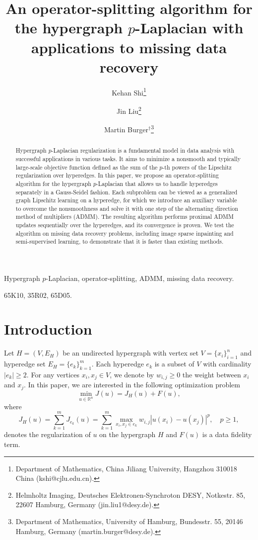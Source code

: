 \documentclass{article}
\title{An operator-splitting algorithm for the hypergraph $p$-Laplacian with applications to missing data recovery}
\author{
Kehan Shi\thanks{Department of Mathematics, China Jiliang University, Hangzhou 310018 China (kshi@cjlu.edu.cn).}
\and
Jin Liu\thanks{Helmholtz Imaging, Deutsches Elektronen-Synchroton DESY, Notkestr. 85,
22607 Hamburg, Germany (jin.liu1@desy.de).}
\and
 Martin Burger$^\dagger$\thanks{Department of Mathematics, University of Hamburg, Bundesstr. 55, 20146
Hamburg, Germany (martin.burger@desy.de).}
}
\date{}
\theoremstyle{definition}
\begin{document}

\maketitle

\begin{abstract}
Hypergraph $p$-Laplacian regularization is a fundamental model in data analysis with successful applications in various tasks. It aims to minimize a nonsmooth and typically large-scale objective function defined as the sum of the $p$-th powers of the Lipschitz regularization over hyperedges.
In this paper, we propose an operator-splitting algorithm for the hypergraph $p$-Laplacian that allows us to handle hyperedges separately in a Gauss-Seidel fashion. Each subproblem can be viewed as a generalized graph Lipschitz learning on a hyperedge, for which we introduce an auxiliary variable to overcome the nonsmoothness and solve it with one step of the alternating direction method of multipliers (ADMM).
The resulting algorithm performs proximal ADMM updates sequentially over the hyperedges, and its convergence is proven.
We test the algorithm on missing data recovery problems, including image sparse inpainting and semi-supervised learning, to demonstrate that it is faster than existing methods.
\end{abstract}

\medskip

 Hypergraph $p$-Laplacian, operator-splitting, ADMM,
missing data recovery.


\medskip

 65K10, 35R02, 65D05.



\section{Introduction}
Let $H=(V, E_H)$ be an undirected hypergraph with vertex set $V=\{x_i\}_{i=1}^n$ and hyperedge set $E_H=\{e_k\}_{k=1}^m$.
Each hyperedge $e_k$ is a subset of $V$ with cardinality $|e_k|\geq 2$.
For any vertices $x_i, x_j\in V$, we denote by $w_{i,j}\geq 0$ the weight between $x_i$ and $x_j$.
In this paper, we are interested in the following optimization problem
\begin{equation}\label{eq:1.1}
  \min_{u\in\mathbb{R}^n}
   J(u)=J_H(u)+ F(u),
\end{equation}
where
\begin{equation}\label{eq:1.1a}
J_H(u)=\sum_{k=1}^mJ_{e_k}(u)=\sum_{k=1}^m \max_{x_i,x_j\in e_k}w_{i,j}|u(x_i)-u(x_j)|^p, \quad p\geq 1,
\end{equation}
denotes the regularization of $u$ on the hypergraph $H$ and $F(u)$ is a data fidelity term.
\end{document}
